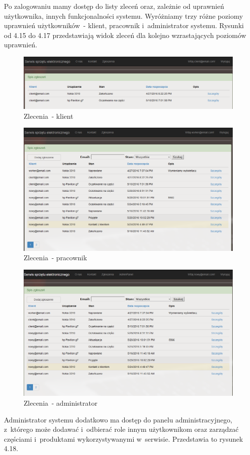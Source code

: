 \documentclass[a4paper,11pt]{article}
\begin{document}
Po zalogowaniu mamy dostęp do listy zleceń oraz, zależnie od uprawnień użytkownika, innych funkcjonalności systemu. Wyróżniamy trzy różne poziomy uprawnień użytkowników~- klient, pracownik i~administrator systemu. Rysunki od 4.15 do 4.17 przedstawiają widok zleceń dla kolejno wzrastających poziomów uprawnień.

\begin{figure}[H]
	\centering
	\includegraphics[width=\textwidth,height=0.2\textheight]{serwisKlient.png}
	\caption{Zlecenia~- klient}
\end{figure}
\begin{figure}[H]
	\centering
	\includegraphics[width=\textwidth,height=0.6\textheight]{serwisWorker.png}
	\caption{Zlecenia~- pracownik}
\end{figure}
\begin{figure}[H]
	\centering
	\includegraphics[width=\textwidth,height=0.6\textheight]{serwisZlecenia.png}
	\caption{Zlecenia~- administrator}
\end{figure}
\newpage
Administrator systemu dodatkowo ma dostęp do panelu administracyjnego, z~którego może dodawać i~odbierać role innym użytkownikom oraz zarządzać częściami i~produktami wykorzystywanymi w~serwisie. Przedstawia to rysunek 4.18.
\end{document}
